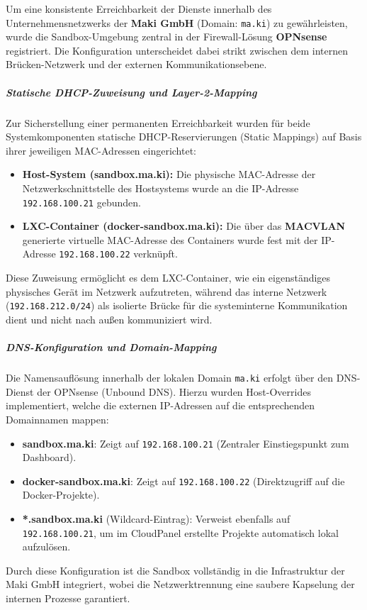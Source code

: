 \documentclass[11pt,
a4paper,
numbers=nonperiod,
footsepline,
oneside,
numbers=noenddot,
bibliography=totoc
]{scrartcl}
\begin{document}
Um eine konsistente Erreichbarkeit der Dienste innerhalb des Unternehmensnetzwerks der \textbf{Maki GmbH} (Domain: \texttt{ma.ki}) zu gewährleisten, wurde die Sandbox-Umgebung zentral in der Firewall-Lösung \textbf{OPNsense} registriert. Die Konfiguration unterscheidet dabei strikt zwischen dem internen Brücken-Netzwerk und der externen Kommunikationsebene.

\subparagraph{Statische DHCP-Zuweisung und Layer-2-Mapping}
Zur Sicherstellung einer permanenten Erreichbarkeit wurden für beide Systemkomponenten statische DHCP-Reservierungen (Static Mappings) auf Basis ihrer jeweiligen MAC-Adressen eingerichtet:

\begin{itemize}
	\item \textbf{Host-System (sandbox.ma.ki):} Die physische MAC-Adresse der Netzwerkschnittstelle des Hostsystems wurde an die IP-Adresse \texttt{192.168.100.21} gebunden.
	\item \textbf{LXC-Container (docker-sandbox.ma.ki):} Die über das \textbf{MACVLAN} generierte virtuelle MAC-Adresse des Containers wurde fest mit der IP-Adresse \texttt{192.168.100.22} verknüpft.
\end{itemize}

Diese Zuweisung ermöglicht es dem LXC-Container, wie ein eigenständiges physisches Gerät im Netzwerk aufzutreten, während das interne Netzwerk (\texttt{192.168.212.0/24}) als isolierte Brücke für die systeminterne Kommunikation dient und nicht nach außen kommuniziert wird.

\subparagraph{DNS-Konfiguration und Domain-Mapping}
Die Namensauflösung innerhalb der lokalen Domain \texttt{ma.ki} erfolgt über den DNS-Dienst der OPNsense (Unbound DNS). Hierzu wurden Host-Overrides implementiert, welche die externen IP-Adressen auf die entsprechenden Domainnamen mappen:

\begin{itemize}
	\item \textbf{sandbox.ma.ki}: Zeigt auf \texttt{192.168.100.21} (Zentraler Einstiegspunkt zum Dashboard).
	\item \textbf{docker-sandbox.ma.ki}: Zeigt auf \texttt{192.168.100.22} (Direktzugriff auf die Docker-Projekte).
	\item \textbf{*.sandbox.ma.ki} (Wildcard-Eintrag): Verweist ebenfalls auf \texttt{192.168.100.21}, um im CloudPanel erstellte Projekte automatisch lokal aufzulösen.
\end{itemize}

Durch diese Konfiguration ist die Sandbox vollständig in die Infrastruktur der Maki GmbH integriert, wobei die Netzwerktrennung eine saubere Kapselung der internen Prozesse garantiert.
\end{document}

